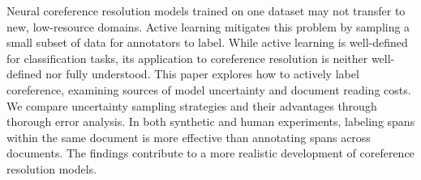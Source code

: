 Neural coreference resolution models trained on one dataset may not
transfer to new, low-resource domains.
Active learning mitigates this problem by sampling a small subset of data for annotators to label.
While active learning is well-defined for classification tasks, its application
to coreference resolution is neither well-defined nor fully understood.
This paper explores how to actively label coreference, examining sources of model uncertainty and document reading costs.
We compare uncertainty sampling strategies and their advantages through thorough error analysis.
In both synthetic and human experiments, labeling
spans within the same document is more effective than annotating spans across documents.
The findings contribute to a more realistic development of coreference resolution models.

